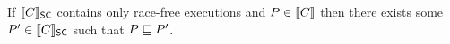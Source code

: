 \begin{theorem}
  If $\llbracket C\rrbracket_{\mathsf{SC}}$ contains only race-free executions and
  $P\in\llbracket C\rrbracket$ then there exists some $P'\in\llbracket C\rrbracket_{\mathsf{SC}}$ such
  that $P\sqsubseteq P'$.
\end{theorem}
  
